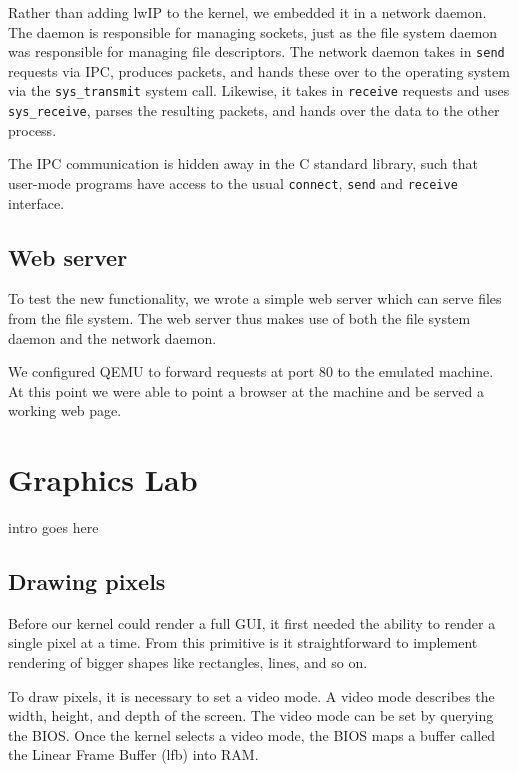 \documentclass{article}
\begin{document}
Rather than adding lwIP to the kernel, we embedded it in a network daemon. The
daemon is responsible for managing sockets, just as the file system daemon was
responsible for managing file descriptors. The network daemon takes in
\texttt{send} requests via IPC, produces packets, and hands these over to the
operating system via the \texttt{sys\_transmit} system call. Likewise, it
takes in \texttt{receive} requests and uses \texttt{sys\_receive}, parses the
resulting packets, and hands over the data to the other process.

The IPC communication is hidden away in the C standard library, such that
user-mode programs have access to the usual \texttt{connect}, \texttt{send}
and \texttt{receive} interface.



\subsection{Web server}
To test the new functionality, we wrote a simple web server which can serve
files from the file system. The web server thus makes use of both the file
system daemon and the network daemon. 

We configured QEMU to forward requests at port 80 to the emulated machine. At
this point we were able to point a browser at the machine and be served a
working web page.








\section{Graphics Lab}


intro goes here

\subsection{Drawing pixels}
Before our kernel could render a full GUI, it first needed the ability
to render a single pixel at a time. From this primitive is it straightforward
to implement rendering of bigger shapes like rectangles, lines, and so on.

To draw pixels, it is necessary to set a video mode. A video mode describes
the width, height, and depth of the screen. The video mode can be set by
querying the BIOS. Once the kernel selects a video mode, the BIOS maps a
buffer called the Linear Frame Buffer (\gls{lfb}) into RAM. 
\end{document}
